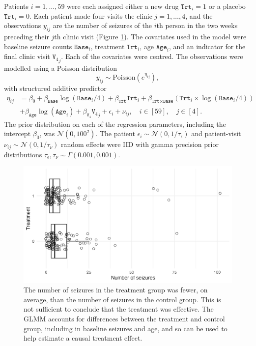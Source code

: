 \documentclass[a4paper, nobind]{templates/ociamthesis}
\begin{document}
Patients \(i = 1, \ldots, 59\) were each assigned either a new drug \(\texttt{Trt}_i = 1\) or a placebo \(\texttt{Trt}_i = 0\).
Each patient made four visits the clinic \(j = 1, \ldots, 4\), and the observations \(y_{ij}\) are the number of seizures of the \(i\)th person in the two weeks preceding their \(j\)th clinic visit (Figure \ref{fig:epil}).
The covariates used in the model were baseline seizure counts \(\texttt{Base}_i\), treatment \(\texttt{Trt}_i\), age \(\texttt{Age}_i\), and an indicator for the final clinic visit \({\texttt{V}_4}_j\).
Each of the covariates were centred.
The observations were modelled using a Poisson distribution
\begin{equation}
y_{ij} \sim \text{Poisson}(e^{\eta_{ij}}),
\end{equation}
with structured additive predictor
\begin{align}
\eta_{ij}
&= \beta_0 + \beta_\texttt{Base} \log(\texttt{Base}_i / 4) + \beta_\texttt{Trt} \texttt{Trt}_i +
   \beta_{\texttt{Trt} \times \texttt{Base}} (\texttt{Trt}_i \times \log(\texttt{Base}_i / 4)) \\ 
&+ \beta_\texttt{Age} \log(\texttt{Age}_i) + \beta_{\texttt{V}_4} {\texttt{V}_4}_j +
   \epsilon_i + \nu_{ij}, \quad i \in [59], \quad j \in [4]. \label{eq:epil}
\end{align}
The prior distribution on each of the regression parameters, including the intercept \(\beta_0\), was \(\mathcal{N}(0, 100^2)\).
The patient \(\epsilon_i \sim \mathcal{N}(0, 1/\tau_\epsilon)\) and patient-visit \(\nu_{ij} \sim \mathcal{N}(0, 1/\tau_\nu)\) random effects were IID with gamma precision prior distributions \(\tau_\epsilon, \tau_\nu \sim \Gamma(0.001, 0.001)\).



\begin{figure}
\includegraphics[width=0.95\linewidth]{figures/naomi-aghq/epil} \caption{The number of seizures in the treatment group was fewer, on average, than the number of seizures in the control group. This is not sufficient to conclude that the treatment was effective. The GLMM accounts for differences between the treatment and control group, including in baseline seizures and age, and so can be used to help estimate a causal treatment effect.}\label{fig:epil}
\end{figure}
\end{document}
